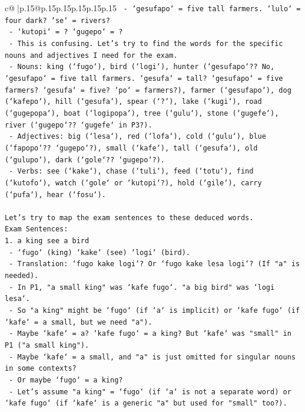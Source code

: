 \documentclass{article}
\begin{document}
{\begin{supertabular}{c@{$\;$}|p{.15\linewidth}@{}p{.15\linewidth}p{.15\linewidth}p{.15\linewidth}p{.15\linewidth}p{.15\linewidth}}
{{{\texttt{    {-} `gesufapo` = five tall farmers. `lulo` = four dark? `se` = rivers?} \\
\texttt{    {-} `kutopi` = ? `gugepo` = ?} \\
\texttt{    {-} This is confusing. Let's try to find the words for the specific nouns and adjectives I need for the exam.} \\
\texttt{    {-} Nouns: king (`fugo`), bird (`logi`), hunter (`gesufapo`?? No, `gesufapo` = five tall farmers. `gesufa` = tall? `gesufapo` = five farmers? `gesufa` = five? `po` = farmers?), farmer (`gesufapo`), dog (`kafepo`), hill (`gesufa`), spear (`?`), lake (`kugi`), road (`gugepopa`), boat (`logipopa`), tree (`gulu`), stone (`gugefe`), river (`gugepo`?? `gugefe` in P3?).} \\
\texttt{    {-} Adjectives: big (`lesa`), red (`lofa`), cold (`gulu`), blue (`fapopo`?? `gugepo`?), small (`kafe`), tall (`gesufa`), old (`gulupo`), dark (`gole`?? `gugepo`?).} \\
\texttt{    {-} Verbs: see (`kake`), chase (`tuli`), feed (`totu`), find (`kutofo`), watch (`gole` or `kutopi`?), hold (`gile`), carry (`pufa`), hear (`fosu`).} \\
\\ 
\texttt{Let's try to map the exam sentences to these deduced words.} \\
\texttt{Exam Sentences:} \\
\texttt{1. a king see a bird} \\
\texttt{   {-} `fugo` (king) `kake` (see) `logi` (bird).} \\
\texttt{   {-} Translation: `fugo kake logi`? Or `fugo kake lesa logi`? (If "a" is needed).} \\
\texttt{   {-} In P1, "a small king" was `kafe fugo`. "a big bird" was `logi lesa`.} \\
\texttt{   {-} So "a king" might be `fugo` (if `a` is implicit) or `kafe fugo` (if `kafe` = a small, but we need "a").} \\
\texttt{   {-} Maybe `kafe` = a? `kafe fugo` = a king? But `kafe` was "small" in P1 ("a small king").} \\
\texttt{   {-} Maybe `kafe` = a small, and "a" is just omitted for singular nouns in some contexts?} \\
\texttt{   {-} Or maybe `fugo` = a king?} \\
\texttt{   {-} Let's assume "a king" = `fugo` (if `a` is not a separate word) or `kafe fugo` (if `kafe` is a generic "a" but used for "small" too?).} \\
}}}
\end{supertabular}}
\end{document}
